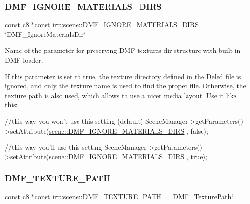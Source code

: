 \subsubsection{\texorpdfstring{D\+M\+F\+\_\+\+I\+G\+N\+O\+R\+E\+\_\+\+M\+A\+T\+E\+R\+I\+A\+L\+S\+\_\+\+D\+I\+RS}{DMF\_IGNORE\_MATERIALS\_DIRS}}
{\footnotesize\ttfamily const \hyperlink{namespaceirr_a9395eaea339bcb546b319e9c96bf7410}{c8} $\ast$const irr\+::scene\+::\+D\+M\+F\+\_\+\+I\+G\+N\+O\+R\+E\+\_\+\+M\+A\+T\+E\+R\+I\+A\+L\+S\+\_\+\+D\+I\+RS = \char`\"{}D\+M\+F\+\_\+\+Ignore\+Materials\+Dir\char`\"{}}



Name of the parameter for preserving D\+MF textures dir structure with built-\/in D\+MF loader. 

If this parameter is set to true, the texture directory defined in the Deled file is ignored, and only the texture name is used to find the proper file. Otherwise, the texture path is also used, which allows to use a nicer media layout. Use it like this\+: 
\begin{DoxyCode}
\textcolor{comment}{//this way you won't use this setting (default)}
SceneManager->getParameters()->setAttribute(\hyperlink{namespaceirr_1_1scene_a65c32f1534d2bff391ded668a748e39b}{scene::DMF\_IGNORE\_MATERIALS\_DIRS}
      , \textcolor{keyword}{false});
\end{DoxyCode}
 
\begin{DoxyCode}
\textcolor{comment}{//this way you'll use this setting}
SceneManager->getParameters()->setAttribute(\hyperlink{namespaceirr_1_1scene_a65c32f1534d2bff391ded668a748e39b}{scene::DMF\_IGNORE\_MATERIALS\_DIRS}
      , \textcolor{keyword}{true});
\end{DoxyCode}
 \mbox{\label{namespaceirr_1_1scene_a0dc81c29a0fa37b3aa7c9dcfc9828eaa}} 
\subsubsection{\texorpdfstring{D\+M\+F\+\_\+\+T\+E\+X\+T\+U\+R\+E\+\_\+\+P\+A\+TH}{DMF\_TEXTURE\_PATH}}
{\footnotesize\ttfamily const \hyperlink{namespaceirr_a9395eaea339bcb546b319e9c96bf7410}{c8} $\ast$const irr\+::scene\+::\+D\+M\+F\+\_\+\+T\+E\+X\+T\+U\+R\+E\+\_\+\+P\+A\+TH = \char`\"{}D\+M\+F\+\_\+\+Texture\+Path\char`\"{}}



